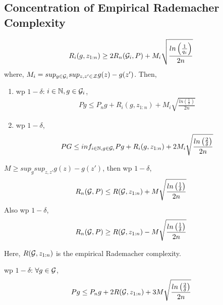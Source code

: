\documentclass[twoside]{article}
\begin{document}
\subsection{Concentration of Empirical Rademacher Complexity}
\begin{theorem}
    \begin{align*}
        R_i(g, z_{1:n}) \geq 2R_n(\mathcal{G}_i, P) + M_i\sqrt{\frac{ln\left(\frac{1}{q_i}\right)}{2n}}
    \end{align*}
    where, $M_i = sup_{g \in \mathcal{G}_i} sup_{z, z' \in \mathcal{Z}} g(z) - g(z')$. Then,
    \begin{enumerate}
        \item wp $1-\delta$: $i \in \mathbb{N}, g \in \mathcal{G}_i$,
        \begin{align*}
            Pg \leq P_n g + R_i(g, z_{1:n}) + M_i\sqrt{\frac{ln\left(\frac{1}{\delta}\right)}{2n}}
        \end{align*}
        \item wp $1-\delta$,
        \begin{align*}
            PG \leq inf_{i \in \mathbb{N}, g \in \mathcal{G}_i} Pg + R_i(g, z_{1:n}) + 2M_i\sqrt{\frac{ln\left(\frac{2}{\delta}\right)}{2n}}
        \end{align*}
    \end{enumerate}
\end{theorem}

\begin{theorem}
    $M \geq sup_{g} sup_{z, z'} g(z) - g(z')$, then wp $1-\delta$,
    \begin{align*}
        R_n(\mathcal{G}, P) \leq R(\mathcal{G}, z_{1:n}) + M\sqrt{\frac{ln\left(\frac{1}{\delta}\right)}{2n}}
    \end{align*}
    Also wp $1-\delta$,
    \begin{align*}
        R_n(\mathcal{G}, P) \geq R(\mathcal{G}, z_{1:n}) - M\sqrt{\frac{ln\left(\frac{1}{\delta}\right)}{2n}}
    \end{align*}
\end{theorem}

Here, $R(\mathcal{G}, z_{1:n})$ is the empirical Rademacher complexity.

\begin{corollary}
    wp $1-\delta$: $\forall g \in \mathcal{G}$,
    \begin{align*}
        Pg \leq P_n g + 2R(\mathcal{G}, z_{1:n}) + 3M\sqrt{\frac{ln\left(\frac{2}{\delta}\right)}{2n}}
    \end{align*}
\end{corollary}
\end{document}
